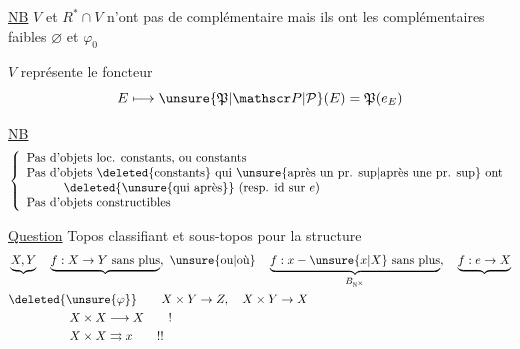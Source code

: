 \uline{NB}  $V$ et $R^*\cap V$ n'ont pas de complémentaire mais ils ont les complémentaires faibles $\varnothing$ et $\varphi_0$

$V$ représente le  foncteur
\[
 E\longmapsto\unsure{\mathfrak P|\mathscr P|\mathcal P}(E)=\mathfrak P(e_E)
\]


\uline{NB}
\[
 \left\{\begin{array}{l}
 \text{Pas d'objets loc. constants, ou constants}\\
 \text{Pas d'objets \deleted{constants} qui \unsure{après un pr. sup|après une pr. sup} ont}\\
 \hspace{3em}\text{\deleted{\unsure{qui après}} (resp. id sur }e\text{)}\\
 \text{Pas d'objets constructibles}
 \end{array}\right.
\]


\uline{Question} Topos classifiant et sous-topos pour la structure
\[
 \begin{aligned}
 &\underbrace{X,Y}\quad\underbrace{f:X\to Y\ \text{sans plus}},\ \text{\unsure{ou|où}}\quad
 \underbrace{f:x-\unsure{x|X}\ \text{sans plus}}_{B_{\mathbb N^{\times}}},\quad \underbrace{f:e\to X}\\
 &\deleted{\unsure{\varphi}}\qquad X\times Y\to Z,\quad X\times Y\to X\\
 &\hspace{5em}X\times X\longrightarrow X\qquad !\\
 &\hspace{5em}X\times X\rightrightarrows x\qquad !!
 \end{aligned}
\]

